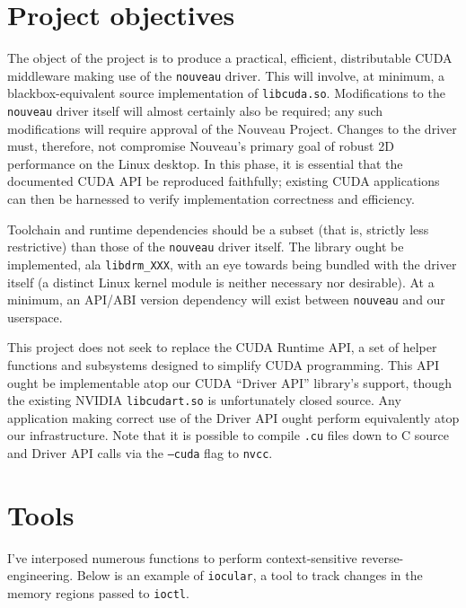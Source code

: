 \documentclass[letterpaper,10pt]{article}
\begin{document}
\begin{multicols}{2}
\section{Project objectives}
The object of the project is to produce a practical, efficient, distributable
CUDA middleware making use of the \texttt{nouveau} driver. This will involve,
at minimum, a blackbox-equivalent source implementation of \texttt{libcuda.so}.
Modifications to the \texttt{nouveau} driver itself will almost certainly also
be required; any such modifications will require approval of the Nouveau Project.
Changes to the driver must, therefore, not compromise Nouveau's primary goal of
robust 2D performance on the Linux desktop. In this phase, it is essential that
the documented CUDA API be reproduced faithfully; existing CUDA applications can
then be harnessed to verify implementation correctness and efficiency.

Toolchain and runtime dependencies should be a subset (that is, strictly less
restrictive) than those of the \texttt{nouveau} driver itself. The library
ought be implemented, ala \texttt{libdrm\_XXX}, with an eye towards being bundled
with the driver itself (a distinct Linux kernel module is neither necessary nor
desirable). At a minimum, an API/ABI version dependency will exist between
\texttt{nouveau} and our userspace.

This project does not seek to replace the CUDA Runtime API, a set of helper
functions and subsystems designed to simplify CUDA programming. This API ought
be implementable atop our CUDA ``Driver API'' library's support, though the
existing NVIDIA \texttt{libcudart.so} is unfortunately closed source. Any
application making correct use of the Driver API ought perform equivalently atop
our infrastructure. Note that it is possible to compile \texttt{.cu} files down
to C source and Driver API calls via the \texttt{--cuda} flag to \texttt{nvcc}\cite{nvcc}.
\section{Tools}
I've interposed numerous functions to perform context-sensitive
reverse-engineering. Below is an example of \texttt{iocular}, a tool to track
changes in the memory regions passed to \texttt{ioctl}.


\end{multicols}
\end{document}
